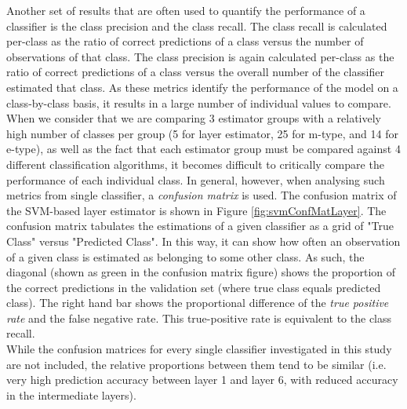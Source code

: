 Another set of results that are often used to quantify the performance of a classifier is the class precision and the class recall. The class recall is calculated per-class as the ratio of correct predictions of a class versus the number of observations of that class. The class precision is again calculated per-class as the ratio of correct predictions of a class versus the overall number of the classifier estimated that class.  As these metrics identify the performance of the model on a class-by-class basis, it results in a large number of individual values to compare. When we consider that we are comparing 3 estimator groups with a relatively high number of classes per group (5 for layer estimator, 25 for m-type, and 14 for e-type), as well as the fact that each estimator group must be compared against 4 different classification algorithms, it becomes difficult to critically compare the performance of each individual class. In general, however, when analysing such metrics from single classifier, a \emph{confusion matrix} is used. The confusion matrix of the SVM-based layer estimator is shown in Figure \ref{fig:svmConfMatLayer}. The confusion matrix tabulates the estimations of a given classifier as a grid of "True Class" versus "Predicted Class". In this way, it can show how often an observation of a given class is estimated as belonging to some other class. As such, the diagonal (shown as green in the confusion matrix figure) shows the proportion of the correct predictions in the validation set (where true class equals predicted class). The right hand bar shows the proportional difference of the \emph{true positive rate} and the {false negative rate}. This true-positive rate is equivalent to the class recall.\\
While the confusion matrices for every single classifier investigated in this study are not included, the relative proportions between them tend to be similar (i.e. very high prediction accuracy between layer 1 and layer 6, with reduced accuracy in the intermediate layers).

